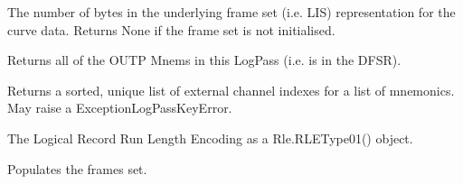 \documentclass[letterpaper,10pt,english]{sphinxmanual}
\begin{document}
\begin{fulllineitems}
\begin{fulllineitems}
\end{fulllineitems}


\begin{fulllineitems}
\label{\detokenize{ref/LIS/core/LogPass:TotalDepth.LIS.core.LogPass.LogPass.numBytes}}
The number of bytes in the underlying frame set (i.e. LIS) representation for the curve data.
Returns None if the frame set is not initialised.

\end{fulllineitems}


\begin{fulllineitems}
\label{\detokenize{ref/LIS/core/LogPass:TotalDepth.LIS.core.LogPass.LogPass.outpMnemS}}
Returns all of the OUTP Mnems in this LogPass (i.e. is in the DFSR).

\end{fulllineitems}


\begin{fulllineitems}
\label{\detokenize{ref/LIS/core/LogPass:TotalDepth.LIS.core.LogPass.LogPass.retExtChIndexList}}
Returns a sorted, unique list of external channel indexes for a list
of mnemonics. May raise a ExceptionLogPassKeyError.

\end{fulllineitems}


\begin{fulllineitems}
\label{\detokenize{ref/LIS/core/LogPass:TotalDepth.LIS.core.LogPass.LogPass.rle}}
The Logical Record Run Length Encoding as a Rle.RLEType01() object.

\end{fulllineitems}


\begin{fulllineitems}
\label{\detokenize{ref/LIS/core/LogPass:TotalDepth.LIS.core.LogPass.LogPass.setFrameSet}}
Populates the frames set.


\end{fulllineitems}
\end{fulllineitems}
\end{document}
